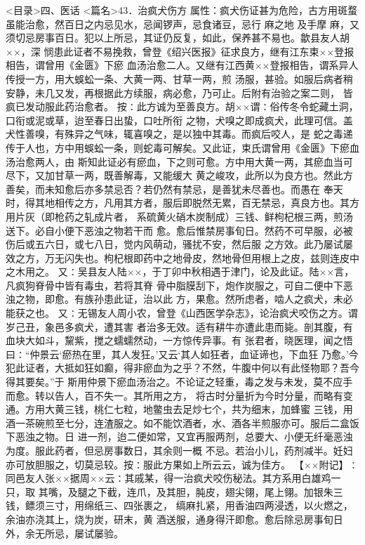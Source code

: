 \documentclass[a4paper,12pt,UTF8,twoside]{ctexbook}
\begin{document}
<目录>四、医话
<篇名>43．治疯犬伤方
属性：疯犬伤证甚为危险，古方用斑蝥虽能治愈，然百日之内忌见水，忌闻锣声，忌食诸豆，忌行 麻之地 
及手摩 麻，又须切忌房事百日。犯以上所忌，其证仍反复，如此，保养甚不易也。歙县友人胡××，深 
悯患此证者不易挽救，曾登《绍兴医报》征求良方，继有江东束××登报相告，谓曾用《金匮》下瘀 
血汤治愈二人。又继有江西黄××登报相告，谓系异人传授一方，用大蜈蚣一条、大黄一两、甘草一两，煎 
汤服，甚验。如服后病者稍安静，未几又发，再根据此方续服，病必愈，乃可止。后附有治验之案二则， 
皆疯已发动服此药治愈者。 
按∶此方诚为至善良方。胡××谓∶俗传冬令蛇藏土洞，口衔或泥或草，迨至春日出蛰，口吐所衔 
之物，犬嗅之即成疯犬，此理可信。盖犬性善嗅，有殊异之气味，辄喜嗅之，是以独中其毒。而疯后咬人，是 
蛇之毒递传于人也，方中用蜈蚣一条，则蛇毒可解矣。又此证，束氏谓曾用《金匮》下瘀血汤治愈两人，由 
斯知此证必有瘀血，下之则可愈。方中用大黄一两，其瘀血当可尽下，又加甘草一两，既善解毒，又能缓大 
黄之峻攻，此所以为良方也。然此方善矣，而未知愈后亦多禁忌否？若仍然有禁忌，是善犹未尽善也。而愚在 
奉天时，得其地相传之方，凡用其方者，服后即脱然无累，百无禁忌，真良方也。其方用片灰（即枪药之轧成片者， 
系硫黄火硝木炭制成）三钱、鲜枸杞根三两，煎汤送下。必自小便下恶浊之物若干而 
愈。愈后惟禁房事旬日。然药不可早服，必被伤后或五六日，或七八日，觉内风萌动，骚扰不安，然后服 
之方效。此乃屡试屡效之方，万无闪失也。枸杞根即药中之地骨皮，然地骨但用根上之皮，兹则连皮中之木用之。 
又∶吴县友人陆××，于丁卯中秋相遇于津门，论及此证。陆××言，凡疯狗脊骨中皆有毒虫，若将其脊 
骨中脂膜刮下，炮作炭服之，可自二便中下恶浊之物，即愈。有族孙患此证，治以此 
方，果愈。然所虑者，啮人之疯犬，未必能获之也。 
又∶无锡友人周小农，曾登《山西医学杂志》，论治疯犬咬伤之方。谓岁己丑，象邑多疯犬，遭其害 
者治多无效。适有耕牛亦遭此患而毙。剖其腹，有血块大如斗，黧紫，搅之蠕蠕然动，一方惊传异事。有 
张君者，晓医理，闻之悟曰∶“仲景云‘瘀热在里，其人发狂。’又云‘其人如狂者，血证谛也，下血狂 
乃愈。’今犯此证者，大抵如狂如癫，得非瘀血为之乎？不然，牛腹中何以有此怪物耶？吾今得其要矣。”于 
斯用仲景下瘀血汤治之。不论证之轻重，毒之发与未发，莫不应手而愈。转以告人，百不失一。其所用之方， 
将古时分量折为今时分量，而略有变通。方用大黄三钱，桃仁七粒，地鳖虫去足炒七个，共为细末，加蜂蜜 
三钱，用酒一茶碗煎至七分，连渣服之。如不能饮酒者，水、酒各半煎服亦可。服后二盒饭下恶浊之物。日 
进一剂，迨二便如常，又宜再服两剂，总要大、小便无纤毫恶浊为度。服此药者，但忌房事数日，其余则一概 
不忌。若治小儿，药剂减半。妊妇亦可放胆服之，切莫忌较。按∶服此方果如上所云云，诚为佳方。 
【××附记】∶同邑友人张××据周××云∶其戚某，得一治疯犬咬伤秘法。其方系用白雄鸡一只，取 
其嘴，及腿之下截，连爪，及其胆，肫皮，翅尖翎，尾上翎。加银朱三钱，鳔须三寸，用绵纸三、四张裹之， 
缟麻扎紧，用香油四两浸透，以火燃之，余油亦浇其上，烧为炭，研末，黄 
酒送服，通身得汗即愈。愈后除忌房事旬日外，余无所忌，屡试屡验。 
\end{document}
